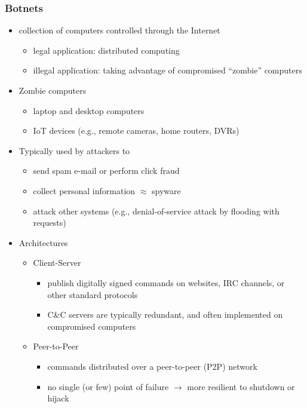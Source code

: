 \documentclass[final]{article}
\begin{document}
\subsubsection*{Botnets}
\begin{itemize}[nosep]
    \item collection of computers controlled through the Internet
          \begin{itemize}[nosep]
              \item legal application: distributed computing
              \item illegal application: taking advantage of compromised ``zombie'' computers
          \end{itemize}
    \item Zombie computers
          \begin{itemize}[nosep]
              \item laptop and desktop computers
              \item IoT devices (e.g., remote cameras, home routers, DVRs)
          \end{itemize}
    \item Typically used by attackers to
          \begin{itemize}[nosep]
              \item send spam e-mail or perform click fraud
              \item collect personal information $\approx$ spyware
              \item attack other systems (e.g., denial-of-service attack by flooding with requests)
          \end{itemize}
    \item Architectures
          \begin{multicols}{2}
              \begin{itemize}[nosep]
                  \item Client-Server
                        \begin{itemize}[nosep]
                            \item publish digitally signed commands on
                                  websites, IRC channels, or other standard protocols
                            \item C\&C servers are typically redundant, and often implemented on compromised computers
                        \end{itemize}
                  \item Peer-to-Peer
                        \begin{itemize}[nosep]
                            \item commands distributed over a peer-to-peer (P2P) network
                            \item no single (or few) point of failure $\rightarrow$ more resilient to shutdown or hijack
                        \end{itemize}
              \end{itemize}
          \end{multicols}
\end{itemize}
\end{document}
